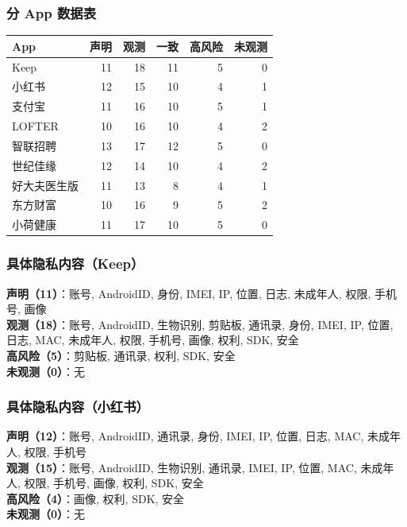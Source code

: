 \documentclass[AutoFakeBold,AutoFakeSlant]{beamer}
\newcommand{\apppiidetail}[4]{%
    \scriptsize
    \textbf{声明（#1）}：#2\\[0.15em]
    \textbf{观测（#3）}：#4\\[0.15em]
}
\begin{document}
\begin{frame}
    \frametitle{分 App 数据表}
    \tiny
    \begin{tabularx}{\textwidth}{|l|r|r|r|r|r|}
        \hline
        \textbf{App} & \textbf{声明} & \textbf{观测} & \textbf{一致} & \textbf{高风险} & \textbf{未观测} \\
        \hline
        Keep & 11 & 18 & 11 & 5 & 0 \\
        \hline
        小红书 & 12 & 15 & 10 & 4 & 1 \\
        \hline
        支付宝 & 11 & 16 & 10 & 5 & 1 \\
        \hline
        LOFTER & 10 & 16 & 10 & 4 & 2 \\
        \hline
        智联招聘 & 13 & 17 & 12 & 5 & 0 \\
        \hline
        世纪佳缘 & 12 & 14 & 10 & 4 & 2 \\
        \hline
        好大夫医生版 & 11 & 13 & 8 & 4 & 1 \\
        \hline
        东方财富 & 10 & 16 & 9 & 5 & 2 \\
        \hline
        小荷健康 & 11 & 17 & 10 & 5 & 0 \\
        \hline
    \end{tabularx}
    \vspace{0.25em}
    \scriptsize
\end{frame}


\begin{frame}
    \frametitle{具体隐私内容（Keep）}
    \apppiidetail{11}{账号, AndroidID, 身份, IMEI, IP, 位置, 日志, 未成年人, 权限, 手机号, 画像}{18}{账号, AndroidID, 生物识别, 剪贴板, 通讯录, 身份, IMEI, IP, 位置, 日志, MAC, 未成年人, 权限, 手机号, 画像, 权利, SDK, 安全}
    \textbf{高风险（5）}：剪贴板, 通讯录, 权利, SDK, 安全\\
    \textbf{未观测（0）}：无
\end{frame}

\begin{frame}
    \frametitle{具体隐私内容（小红书）}
    \apppiidetail{12}{账号, AndroidID, 通讯录, 身份, IMEI, IP, 位置, 日志, MAC, 未成年人, 权限, 手机号}{15}{账号, AndroidID, 生物识别, 通讯录, IMEI, IP, 位置, MAC, 未成年人, 权限, 手机号, 画像, 权利, SDK, 安全}
    \textbf{高风险（4）}：画像, 权利, SDK, 安全\\
    \textbf{未观测（0）}：无
\end{frame}
\end{document}
